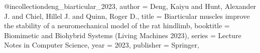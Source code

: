
@incollection{deng_biarticular_2023,
	author = {Deng, Kaiyu and Hunt, Alexander J. and Chiel, Hillel J. and Quinn, Roger D.},
	title = {Biarticular muscles improve the stability of a neuromechanical model of the rat hindlimb},
	booktitle = {Biomimetic and Biohybrid Systems (Living Machines 2023)},
	series = {Lecture Notes in Computer Science},
	year = {2023},
	publisher = {Springer},
}
